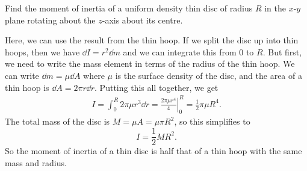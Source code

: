 \documentclass[../classical_mechanics.tex]{subfiles}
\begin{document}
        \begin{example}
            Find the moment of inertia of a uniform density thin disc of radius $R$ in the $x$-$y$ plane rotating about the $z$-axis about its centre.
                    
            Here, we can use the result from the thin hoop.
            If we split the disc up into thin hoops, then we have $\dd{I}=r^2\dd{m}$ and we can integrate this from $0$ to $R$.
            But first, we need to write the mass element in terms of the radius of the thin hoop.
            We can write $\dd{m}=\mu\dd{A}$ where $\mu$ is the surface density of the disc, and the area of a thin hoop is $\dd{A}=2\pi r\dd{r}$.
            Putting this all together, we get
            \begin{align}
                I=\int_0^R 2\pi\mu r^3\dd{r}=\left.\frac{2\pi\mu r^4}{4}\right|_0^R=\frac{1}{2}\pi\mu R^4.
            \end{align}
            The total mass of the disc is $M=\mu A=\mu\pi R^2$, so this simplifies to
            \begin{equation}
                I=\frac{1}{2}MR^2.
            \end{equation}
            So the moment of inertia of a thin disc is half that of a thin hoop with the same mass and radius.
        \end{example}
\end{document}
